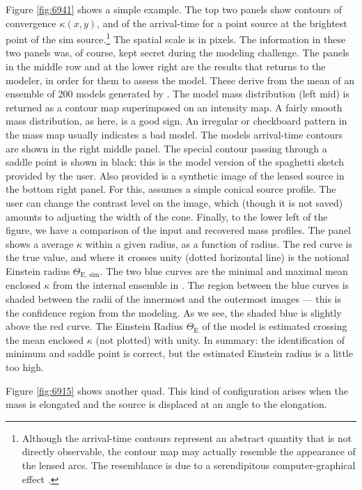 \vfill{}

Figure \ref{fig:6941} shows a simple example.  The top two panels show
contours of convergence $\kappa(x,y)$, and of the arrival-time for a
point source at the brightest point of the sim
source.\footnote{Although the arrival-time contours represent an
  abstract quantity that is not directly observable, the contour map
  may actually resemble the appearance of the lensed arcs.  The
  resemblance is due to a serendipitous computer-graphical effect
  \citep{2001AJ....122..585S}.} The spatial scale is in pixels.  The
information in these two panels was, of course, kept secret during the
modeling challenge.  The panels in the middle row and at the lower
right are the results that \spl returns to the modeler, in order for
them to assess the model.  These derive from the mean of an ensemble
of 200 models generated by \spl.  The model mass distribution (left mid) is
returned as a contour map superimposed on an intensity map. A fairly
smooth mass distribution, as here, is a good sign.  An irregular or
checkboard pattern in the mass map usually indicates a bad model.  The
models arrival-time contours are shown in the right middle panel.
  The special contour passing through a
saddle point is shown in black: this is the model version of the
spaghetti sketch provided by the user.  Also provided is a synthetic
image of the lensed source in the bottom right panel.
  For this, \spl assumes a simple conical
source profile.  The user can change the contrast level on the image,
which (though it is not saved) amounts to adjusting the width of
the cone.  Finally, to the lower left of the figure, we have a
comparison of the input and recovered mass profiles.  The panel shows
a average $\kappa$ within a given radius, as a function of radius.
The red curve is the true value, and where it crosses unity (dotted
horizontal line) is the notional Einstein radius $\Theta_{\text{E, sim}}$.
  The two blue curves
are the minimal and maximal mean enclosed $\kappa$ from the internal
ensemble in \spl.  The region between the blue curves is shaded
between the radii of the innermost and the outermost images --- this
is the confidence region from the modeling.  As we see, the shaded
blue is slightly above the red curve. 
The Einstein Radius $\Theta_\text{E}$ of the model is estimated crossing the
mean enclosed $\kappa$ (not plotted) with unity.
  In summary: the identification
of minimum and saddle point is correct, but the estimated Einstein
radius is a little too high.

Figure \ref{fig:6915} shows another quad.  This kind of configuration
arises when the mass is elongated and the source is displaced at an
angle to the elongation.

